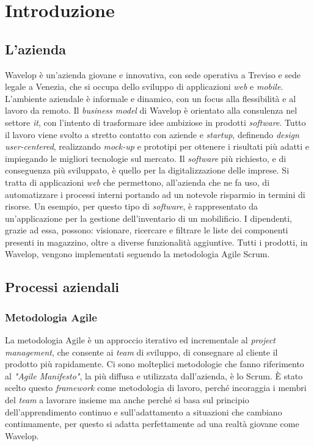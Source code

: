 
\chapter{Introduzione}
\label{cap:intro}
\section{L'azienda}
Wavelop è un'azienda giovane e innovativa, con sede operativa a Treviso e sede legale a Venezia, che si occupa dello sviluppo di applicazioni \emph{web} e \emph{mobile}.
L'ambiente aziendale è informale e dinamico, con un focus alla flessibilità e al lavoro da remoto.
Il \emph{business model} di Wavelop è orientato alla consulenza nel settore \emph{\acrshort{it}}, con l'intento di trasformare idee ambiziose in prodotti \emph{software}.
Tutto il lavoro viene svolto a stretto contatto con aziende e \emph{startup}, definendo \emph{design user-centered}, realizzando \emph{\gls{mock-up}} e prototipi per ottenere i risultati più adatti e impiegando le migliori tecnologie sul mercato.
Il \emph{software} più richiesto, e di conseguenza più sviluppato, è quello per la digitalizzazione delle imprese. 
Si tratta di applicazioni \emph{web} che permettono, all'azienda che ne fa uso, di automatizzare i processi interni portando ad un notevole risparmio in termini di risorse.
Un esempio, per questo tipo di \emph{software}, è rappresentato da un'applicazione per la gestione dell'inventario di un mobilificio.
I dipendenti, grazie ad essa, possono: visionare, ricercare e filtrare le liste dei componenti presenti in magazzino, oltre a diverse funzionalità aggiuntive.
Tutti i prodotti, in Wavelop, vengono implementati seguendo la metodologia Agile Scrum.

\section{Processi aziendali}

\subsection{Metodologia Agile}
La metodologia Agile è un approccio iterativo ed incrementale al \emph{project management}, che consente ai \emph{team} di sviluppo, di consegnare al cliente il prodotto più rapidamente.
Ci sono molteplici metodologie che fanno riferimento al \emph{"Agile Manifesto"}, la più diffusa e utilizzata dall'azienda, è lo Scrum.
È stato scelto questo \emph{framework} come metodologia di lavoro, perché incoraggia i membri del \emph{team} a lavorare insieme ma anche perché si basa sul principio dell'apprendimento continuo e sull'adattamento a situazioni che cambiano continuamente, per questo si adatta perfettamente ad una realtà giovane come Wavelop. \\


